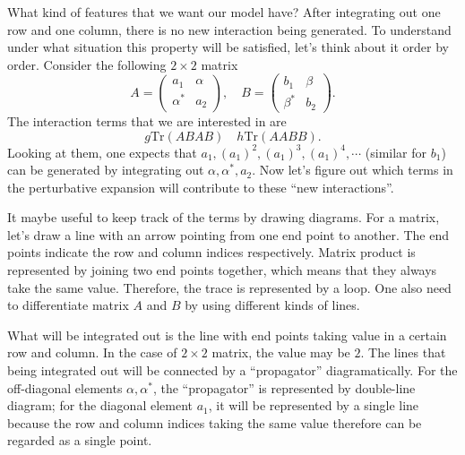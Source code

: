 
What kind of features that we want our model have?
After integrating out one row and one column, there is no new interaction being generated.
To understand under what situation this property will be satisfied,
let's think about it order by order.
Consider the following $2 \times 2$ matrix
\[
	A = \begin{pmatrix} a_1 & \alpha \\ \alpha^* & a_2 \end{pmatrix},\quad B = \begin{pmatrix} b_1 & \beta \\ \beta^* & b_2 \end{pmatrix}
.\] 
The interaction terms that we are interested in are
\[
g \mathrm{Tr}(ABAB) \quad h \mathrm{Tr}(AABB)
.\]
Looking at them, one expects that $a_1, (a_1)^2, (a_1)^3, (a_1)^4, \cdots$ (similar for $b_1$) can be generated by integrating out $\alpha,\alpha^*,a_2$.
Now let's figure out which terms in the perturbative expansion will contribute to these ``new interactions''.

It maybe useful to keep track of the terms by drawing diagrams.
For a matrix, let's draw a line with an arrow pointing from one end point to another.
The end points indicate the row and column indices respectively.
Matrix product is represented by joining two end points together,
which means that they always take the same value.
Therefore, the trace is represented by a loop.
One also need to differentiate matrix $A$ and $B$ by using different kinds of lines.

What will be integrated out is the line with end points taking value in a certain row and column.
In the case of $2 \times 2$ matrix, the value may be $2$.
The lines that being integrated out will be connected by a ``propagator'' diagramatically.
For the off-diagonal elements $\alpha,\alpha^*$, the ``propagator'' is represented by double-line diagram;
for the diagonal element $a_1$, it will be represented by a single line because the row and column indices taking the same value therefore can be regarded as a single point.

